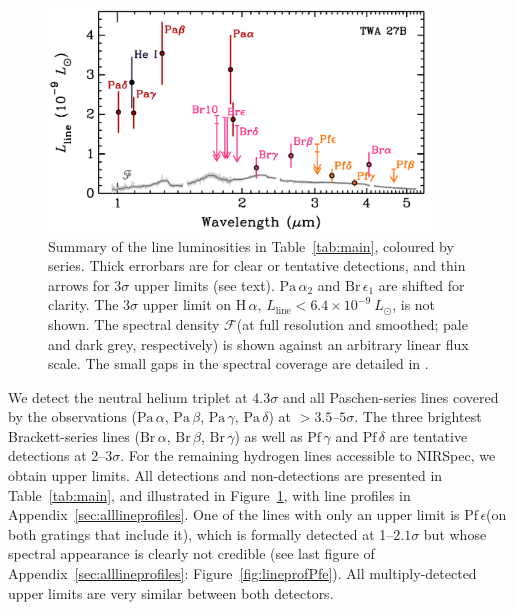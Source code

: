 \documentclass[twocolumn,twocolumnappendix]{aastex631}
\newcommand{\neuI}[1]{{\leavevmode{\boldmath\bfseries#1}}}
\renewcommand{\neuI}[1]{{\leavevmode#1}}
\def\LSonne{\ensuremath{L_\odot}\xspace}           %
\def\Ha{\ensuremath{\mathrm{H}\,\alpha}\xspace}             %
\def\Paa{\ensuremath{\mathrm{Pa}\,\alpha}\xspace}           %
\def\Pab{\ensuremath{\mathrm{Pa}\,\beta}\xspace}            %
\def\Pag{\ensuremath{\mathrm{Pa}\,\gamma}\xspace}           %
\def\Pad{\ensuremath{\mathrm{Pa}\,\delta}\xspace}           %
\def\Bra{\ensuremath{\mathrm{Br}\,\alpha}\xspace}           %
\def\Brb{\ensuremath{\mathrm{Br}\,\beta}\xspace}            %
\def\Brg{\ensuremath{\mathrm{Br}\,\gamma}\xspace}           %
\def\Bre{\ensuremath{\mathrm{Br}\,\epsilon}\xspace}         %
\def\Pfg{\ensuremath{\mathrm{Pf}\,\gamma}\xspace}           %
\def\Pfd{\ensuremath{\mathrm{Pf}\,\delta}\xspace}           %
\def\Pfe{\ensuremath{\mathrm{Pf}\,\epsilon}\xspace}         %
\newcommand{\Fldichte}{\ensuremath{\mathcal{F}}\xspace} %
\def\LLinie{\ensuremath{L_{\textrm{line}}}\xspace}                      %
\begin{document}
\begin{figure}
 \centering
 \includegraphics[width=0.9\textwidth]{TWA27B_Spektrum.pdf}
\caption{%
Summary of the line luminosities in Table~\ref{tab:main}, coloured by series. Thick errorbars are for clear or tentative detections, and thin arrows for $3\sigma$ upper limits (see text).
$\Paa_2$ and \neuI{$\Bre_1$ are} shifted for clarity.
%
%
%
%
The $3\sigma$ upper limit on \Ha, $\LLinie<6.4\times10^{-9}~\LSonne$, is not shown.
The spectral density \Fldichte (at full resolution and smoothed; pale and dark grey, respectively) is shown against an arbitrary linear flux scale.
\neuI{The small gaps in the spectral coverage are detailed in \citet{luhman23c}.}
}
\label{fig:linesoverview}
\end{figure}


%
%
We detect the neutral helium triplet at $4.3\sigma$ and
all Paschen-series lines covered by the observations (\Paa, \Pab, \Pag, \Pad)
at $>3.5$--$5\sigma$.
The three brightest Brackett-series lines (\Bra, \Brb, \Brg) as well as \Pfg and \Pfd are tentative detections at 2--3$\sigma$.
For the remaining hydrogen lines accessible to NIRSpec, we obtain upper limits.
All detections and non-detections are presented in Table~\ref{tab:main}, and illustrated in Figure~\ref{fig:linesoverview}, with line profiles in Appendix~\ref{sec:alllineprofiles}.
One of the lines with only an upper limit is \Pfe (on both gratings that include it), which is formally detected at 1--$2.1\sigma$ but whose spectral appearance is clearly not credible (see \neuI{last figure of Appendix~\ref{sec:alllineprofiles}:} Figure~\ref{fig:lineprofPfe}).
\neuI{All multiply-detected upper limits are very similar between both detectors.}
\end{document}
